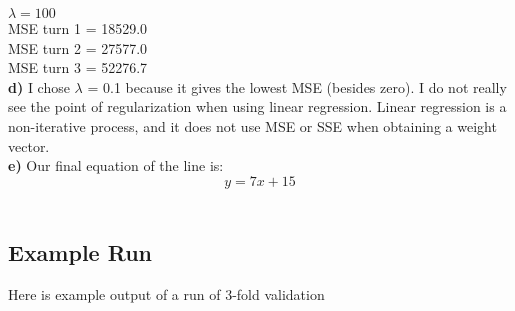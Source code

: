 \documentclass{article}
\begin{document}
 $\lambda =100$ \\
MSE turn  1  =  18529.0 \\
MSE turn  2  =  27577.0 \\
MSE turn  3  =  52276.7 \\

\textbf{d)} I chose $\lambda$ = 0.1 because it gives the lowest MSE (besides zero). I do not really see the point of regularization 
when using linear regression. Linear regression is a non-iterative process, and it does not use MSE or SSE when obtaining a weight vector. \\

\textbf{e)} Our final equation of the line is: $$y = 7 x  + 15$$ \\


\subsection*{Example Run}
Here is example output of a run of 3-fold validation
\end{document}
